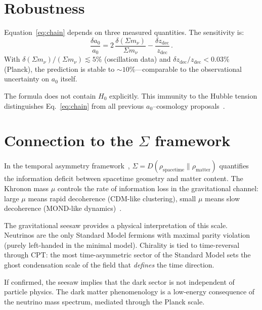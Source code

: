 \documentclass[prl,twocolumn,superscriptaddress,longbibliography]{revtex4-2}
\newcommand{\zdec}{z_{\mathrm{dec}}}
\newcommand{\azero}{a_0}
\newcommand{\sumnu}{\Sigma m_\nu}
\begin{document}
\section{Robustness}

Equation~\eqref{eq:chain} depends on three measured quantities.
The sensitivity is:
\begin{equation}
  \frac{\delta\azero}{\azero}
  = 2\,\frac{\delta(\sumnu)}{\sumnu}
  - \frac{\delta\zdec}{\zdec} \,.
\end{equation}
With $\delta(\sumnu)/(\sumnu) \lesssim 5\%$ (oscillation data)
and $\delta\zdec/\zdec < 0.03\%$ (Planck),
the prediction is stable to $\sim 10\%$---comparable to
the observational uncertainty on $\azero$ itself.

The formula does not contain $H_0$ explicitly.
This immunity to the Hubble tension distinguishes
Eq.~\eqref{eq:chain} from all previous $\azero$--cosmology
proposals~\cite{Milgrom1999,Verlinde2016,Pazy2013}.

\section{Connection to the $\Sigma$ framework}

In the temporal asymmetry framework~\cite{PaperI,PaperII},
$\Sigma = D(\rho_{\mathrm{spacetime}} \| \rho_{\mathrm{matter}})$
quantifies the information deficit between spacetime geometry
and matter content.
The Khronon mass $\mu$ controls the
rate of information loss in the gravitational channel:
large $\mu$ means rapid decoherence (CDM-like clustering),
small $\mu$ means slow decoherence (MOND-like dynamics)~\cite{PaperIII}.

The gravitational seesaw provides a physical interpretation
of this scale.
Neutrinos are the only Standard Model fermions with
maximal parity violation (purely left-handed in the minimal model).
Chirality is tied to time-reversal through CPT:
the most time-asymmetric sector of the Standard Model
sets the ghost condensation scale of the field that
\textit{defines} the time direction.

If confirmed, the seesaw implies that the dark sector
is not independent of particle physics.
The dark matter phenomenology is a low-energy consequence
of the neutrino mass spectrum, mediated through
the Planck scale.
\end{document}
